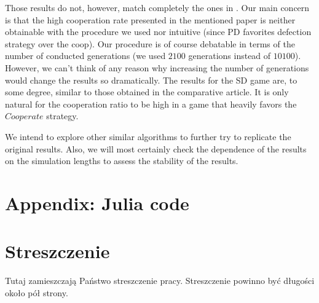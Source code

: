 \documentclass[english, twoside, 12pt, a4paper]{article}
\theoremstyle{definition}
\theoremstyle{plain}
\theoremstyle{remark}
\begin{document}

Those results do not, however, match completely the ones in \cite{santos2005scale}. Our main concern is that the high cooperation rate presented in the mentioned paper is neither obtainable with the procedure we used nor intuitive (since PD favorites defection strategy over the coop). Our procedure is of course debatable in terms of the number of conducted generations (we used $2100$ generations instead of $10100$). However, we can't think of any reason why increasing the number of generations would change the results so dramatically. The results for the SD game are, to some degree, similar to those obtained in the comparative article. It is only natural for the cooperation ratio to be high in a game that heavily favors the $Cooperate$ strategy.


We intend to explore other similar algorithms to further try to replicate the original results. Also, we will most certainly check the dependence of the results on the simulation lengths to assess the stability of the results.

\appendix
\section{Appendix: Julia code}




\clearpage




\clearpage
{}
\listoffigures

\clearpage
{}
\section*{Streszczenie}

Tutaj zamieszczają Państwo streszczenie pracy. Streszczenie powinno być długości około pół strony.
\end{document}
